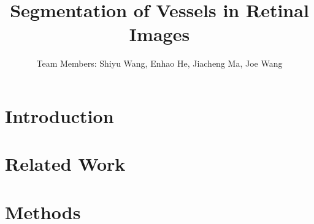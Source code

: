 \documentclass[12pt,letterpaper]{article}
\begin{document}
\title{\textbf{Segmentation of Vessels in Retinal Images}}
\author{Team Members: Shiyu Wang, Enhao He, Jiacheng Ma, Joe Wang}
\date{}
\setlength{\droptitle}{-2.75cm}
\maketitle
\vspace{-2cm}


\section{Introduction}

\section{Related Work}

\section{Methods}
\end{document}
